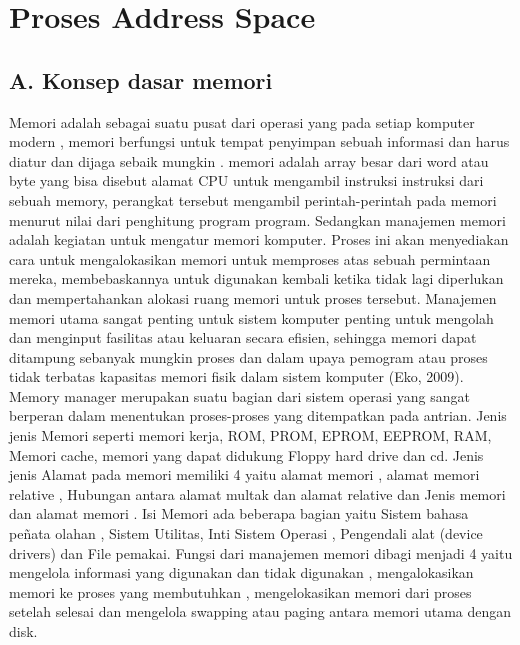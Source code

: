 \section {Proses Address Space}

\subsection {A. Konsep dasar memori}
Memori adalah sebagai suatu pusat dari operasi yang pada setiap komputer modern , memori berfungsi untuk tempat penyimpan sebuah informasi dan harus diatur dan dijaga sebaik mungkin . memori adalah array besar dari word atau byte yang bisa disebut alamat CPU untuk mengambil instruksi instruksi dari sebuah memory, perangkat tersebut mengambil perintah-perintah pada memori menurut nilai dari penghitung program  program.
Sedangkan manajemen memori adalah kegiatan untuk mengatur memori komputer. Proses ini akan menyediakan cara untuk mengalokasikan memori untuk memproses atas sebuah  permintaan mereka, membebaskannya untuk digunakan kembali ketika tidak lagi diperlukan dan mempertahankan alokasi ruang memori untuk proses tersebut. Manajemen memori utama sangat penting untuk sistem komputer  penting untuk mengolah dan menginput fasilitas atau keluaran secara efisien, sehingga memori dapat ditampung sebanyak mungkin proses dan dalam upaya pemogram atau proses tidak terbatas kapasitas memori fisik dalam sistem komputer (Eko, 2009).
Memory manager merupakan suatu bagian dari sistem operasi yang sangat berperan dalam menentukan proses-proses yang ditempatkan pada antrian.
Jenis jenis Memori seperti memori kerja, ROM, PROM, EPROM, EEPROM, RAM, Memori cache, memori yang dapat didukung Floppy hard drive dan cd.
Jenis jenis Alamat pada memori memiliki 4 yaitu alamat memori , alamat memori relative , Hubungan antara alamat multak dan alamat relative dan Jenis memori dan alamat memori .
Isi Memori ada beberapa bagian yaitu Sistem bahasa peñata olahan , Sistem Utilitas, Inti Sistem Operasi , Pengendali alat (device drivers) dan File pemakai.
Fungsi dari manajemen memori dibagi menjadi 4 yaitu mengelola informasi yang digunakan dan tidak digunakan , mengalokasikan memori ke proses yang membutuhkan , mengelokasikan memori dari proses setelah selesai dan mengelola swapping atau paging antara memori utama dengan disk. 


